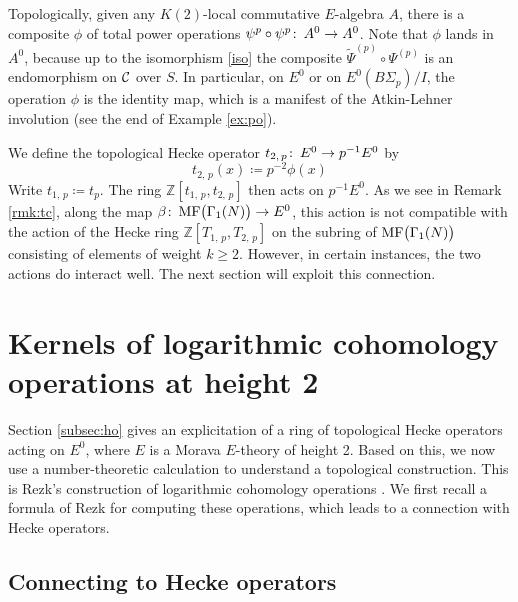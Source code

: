 \documentclass{gtpart}
\theoremstyle{definition}
\theoremstyle{remark}
\def\co{\colon\thinspace}
\newcommand{\mb}[1]{\mathbb{#1}}
\newcommand{\CC}{{\cal C}}
\newcommand{\BZ}{{\mb Z}}
\newcommand{\MF}{{\rm MF}}
\newcommand{\B}{\beta}
\newcommand{\f}{\phi}
\newcommand{\G}{\Gamma}
\newcommand{\ce}{\coloneqq}
\renewcommand{\=}{\approx}
\renewcommand{\-}{\sim}
\numberwithin{equation}{section}
\numberwithin{thm}{section}
\begin{document}
Topologically, given any $K(2)$-local commutative $E$-algebra $A$, 
there is a composite $\f$ of total power operations $\psi^p \circ \psi^p \co A^0 \to A^0$.  
Note that $\phi$ lands in $A^0$, 
because up to the isomorphism \eqref{iso} the composite $\widetilde{\Psi}^{(p)} \circ \Psi^{(p)}$ is an endomorphism on $\CC$ over $S$.  
In particular, on $E^0$ or on $E^0(B\Sigma_p) / I$, the operation 
$\phi$ is the identity map, which is a manifest of the Atkin-Lehner involution (see the end of Example \ref{ex:po}).  

We define the topological Hecke operator $t_{2,\,p} \co E^0 \to p^{-1} E^0$ by 
\begin{equation}
 \label{t2p}
 t_{2,\,p}(x) \ce p^{-2} \phi(x) 
\end{equation}
Write $t_{1,\,p} \ce t_p$.  
The ring $\BZ[t_{1,\,p},t_{2,\,p}]$ then acts on $p^{-1} E^0$.  
As we see in Remark \ref{rmk:tc}, along the map $\B \co \MF\big(\G_1(N)\big) \to E^0$, 
this action is not compatible with the action of the Hecke ring $\BZ[T_{1,\,p},T_{2,\,p}]$ on the subring of $\MF\big(\G_1(N)\big)$ consisting of elements of weight $k \geq 2$.  
However, in certain instances, the two actions do interact well.  
The next section will exploit this connection.  



\section{Kernels of logarithmic cohomology operations at height 2}
\label{sec:kerlog}

Section \ref{subsec:ho} gives an explicitation of a ring of topological Hecke operators acting on $E^0$, where $E$ is a Morava $E$-theory of height 2.  
Based on this, we now use a number-theoretic calculation to understand a topological construction.  
This is Rezk's construction of logarithmic cohomology operations \cite{log}.  
We first recall a formula of Rezk for computing these operations, which leads to a connection with Hecke operators.  



\subsection{Connecting to Hecke operators}
\end{document}
